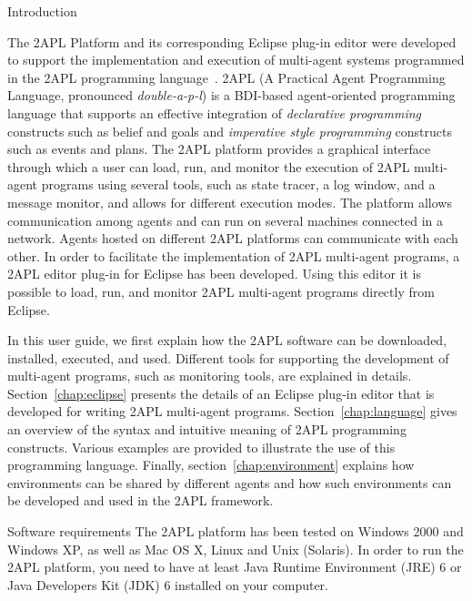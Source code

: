 \begin{chapter}{Introduction}
\label{chap:introduction}

The 2APL Platform and its corresponding Eclipse plug-in editor were
developed to support the implementation and execution of multi-agent
systems programmed in the 2APL programming
language~\cite{Dastani:08a,D-RULECHP09,CLIMA09}. 2APL (A Practical
Agent Programming Language, pronounced \emph{double-a-p-l}) is a
BDI-based agent-oriented programming language that supports an
effective integration of \emph{declarative programming} constructs
such as belief and goals and \emph{imperative style programming}
constructs such as events and plans. The 2APL platform provides a
graphical interface through which a user can load, run, and monitor
the execution of 2APL multi-agent programs using several tools, such
as state tracer, a log window, and a message monitor, and allows for
different execution modes. The platform allows communication among
agents and can run on several machines connected in a network.
Agents hosted on different 2APL platforms can communicate with each
other. In order to facilitate the implementation of 2APL multi-agent
programs, a 2APL editor plug-in for Eclipse has been developed.
Using this editor it is possible to load, run, and monitor 2APL
multi-agent programs directly from Eclipse.

In this user guide, we first explain how the 2APL software can be
downloaded, installed, executed, and used. Different tools for
supporting the development of multi-agent programs, such as
monitoring tools, are explained in details.
Section~\ref{chap:eclipse} presents the details of an Eclipse
plug-in editor that is developed for writing 2APL multi-agent
programs. Section~\ref{chap:language} gives an overview of the
syntax and intuitive meaning of 2APL programming constructs. Various
examples are provided to illustrate the use of this programming
language. Finally, section~\ref{chap:environment} explains how
environments can be shared by different agents and how such
environments can be developed and used in the 2APL framework.

\begin{section}{Software requirements}
The 2APL platform has been tested on Windows 2000 and Windows XP, as
well as Mac OS X, Linux and Unix (Solaris). In order to run the 2APL
platform, you need to have at least Java Runtime Environment (JRE) 6
or Java Developers Kit (JDK) 6 installed on your computer.
\end{section}


\end{chapter}
